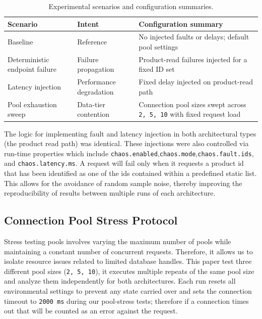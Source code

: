 \documentclass[smallextended,natbib]{svjour3}
\begin{document}
\begin{table}[ht]
	\caption{Experimental scenarios and configuration summaries.}
	\centering
	\begin{tabular}{p{} p{} p{}}
		\toprule
		Scenario                       & Intent                  & Configuration summary                                                        \\
		\midrule
		Baseline                       & Reference               & No injected faults or delays; default pool settings                          \\
		Deterministic endpoint failure & Failure propagation     & Product-read failures injected for a fixed ID set                            \\
		Latency injection              & Performance degradation & Fixed delay injected on product-read path                                    \\
		Pool exhaustion sweep          & Data-tier contention    & Connection pool sizes swept across \texttt{2, 5, 10} with fixed request load \\
		\bottomrule
	\end{tabular}
	\label{experimental_scenarios}
\end{table}

The logic for implementing fault and latency injection in both architectural types (the product read path) was identical. These injections were also controlled via run-time properties which include \texttt{chaos.enabled},\texttt{chaos.mode},\texttt{chaos.fault.ids}, and \texttt{chaos.latency.ms}\cite{chaos_engineering_principles}. A request will fail only when it requests a product id that has been identified as one of the ids contained within a predefined static list. This allows for the avoidance of random sample noise, thereby improving the reproducibility of results between multiple runs of each architecture.

\subsection{Connection Pool Stress Protocol}

Stress testing pools involves varying the maximum number of pools while maintaining a constant number of concurrent requests. Therefore, it allows us to isolate resource issues related to limited database handles. This paper test three different pool sizes (\texttt{2, 5, 10}), it executes multiple repeats of the same pool size and analyze them independently for both architectures. Each run resets all environmental settings to prevent any state carried over and sets the connection timeout to \texttt{2000 ms} during our pool-stress tests; therefore if a connection times out that will be counted as an error against the request.
\end{document}
